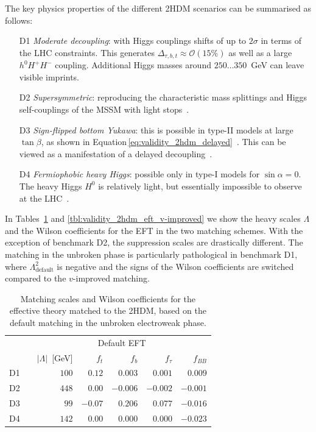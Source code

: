 The key physics properties of the different 2HDM scenarios can be
summarised as follows:
%
\begin{enumerate}
\item[D1] \emph{Moderate decoupling}: with Higgs couplings shifts of
  up to $2\sigma$ in terms of the LHC constraints.  This generates
  $\Delta_{\tau,b,t} \approx \mathcal{O}(15\%)$ as well as a large
  $h^0 H^+ H^-$ coupling. Additional Higgs masses around
  $250\dots350$~GeV can leave visible imprints.
%
\item[D2] \emph{Supersymmetric}: reproducing the characteristic mass
  splittings and Higgs self-couplings of the MSSM with light
  stops~\cite{Carena:2013ytb}.
%
\item[D3] \emph{Sign-flipped bottom Yukawa}: this is possible in
  type-II models at large $\tan\beta$, as shown in
  Equation\,\eqref{eq:validity_2hdm_delayed}~\cite{Ferreira:2014naa}. This
  can be viewed as a manifestation of a delayed
  decoupling~\cite{Haber:2000kq}.
%
\item[D4] \emph{Fermiophobic heavy Higgs}: possible only in type-I
  models for $\sin\alpha =0$. The heavy Higgs $H^0$ is relatively
  light, but essentially impossible to observe at the
  LHC~\cite{Hespel:2014sla}.
\end{enumerate}

In Tables~\ref{tbl:validity_2hdm_eft_default} and
\ref{tbl:validity_2hdm_eft_v-improved} we show the heavy scales
$\Lambda$ and the Wilson coefficients for the EFT in the two matching
schemes. With the exception of benchmark D2, the suppression scales
are drastically different. The matching in the unbroken phase is
particularly pathological in benchmark D1, where
$\Lambda_{\text{default}}^2$ is negative and the signs of the Wilson
coefficients are switched compared to the $v$-improved matching.

\begin{table}
  \begin{tabular}{c c rrrrr }
    \toprule
    \multirow{2}{*}{}
    && \multicolumn{5}{c}{Default EFT} \\
    \cmidrule{3-7} 
    && $|\Lambda|$~[GeV] & $f_t$ & $f_{b}$  & $f_{\tau}$ & $f_{BB}$ \\
    \midrule
    D1 && $100$ & $0.12$ & $0.003$ & $0.001$ & $0.009$ \\
    D2 && $448$ & $0.00$ & $-0.006$ & $-0.002$  & $-0.001$ \\
    D3 && $99$ & $-0.07$ & $0.206$ & $0.077$ &  $-0.016$\\
    D4 && $142$ & $0.00$ & $0.000$ & $0.000$ &  $-0.023$\\
    \bottomrule
  \end{tabular}
  \caption[Default EFT description for the 2HDM benchmarks]{Matching scales and Wilson coefficients for the effective
    theory matched to the 2HDM, based on the default matching in the
    unbroken electroweak phase.}
 \label{tbl:validity_2hdm_eft_default}
\end{table}

